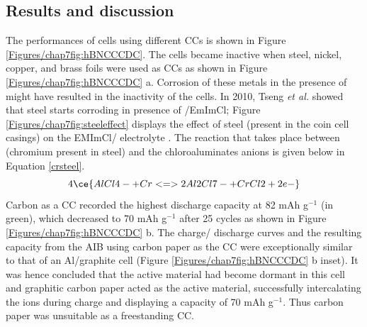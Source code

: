 \subsection{Results and discussion}
The performances of cells using different CCs is shown in Figure \ref{Figures/chap7fig:hBNCCCDC}. The cells became inactive when steel, nickel, copper, and brass foils were used as CCs as shown in Figure \ref{Figures/chap7fig:hBNCCCDC} a. Corrosion of these metals in the presence of  might have resulted in the inactivity of the cells. In 2010, Tseng \textit{et al.} showed that steel starts corroding in presence of /EmImCl; Figure \ref{Figures/chap7fig:steeleffect} displays the effect of steel (present in the coin cell casings) on the EMImCl/ electrolyte \cite{reed_roles_2013, tseng_corrosion_2010}. The reaction that takes place between (chromium present in steel) and the chloroaluminates anions is given below in Equation \ref{crsteel}.
\begin{equation} \label{crsteel}
4\ce{AlCl4- + Cr <=> 2Al2Cl7- + CrCl2 + 2e-} 
\end{equation}
Carbon as a CC recorded the highest discharge capacity at 82 mAh g$^{-1}$ (in green), which decreased to 70 mAh g$^{-1}$ after 25 cycles as shown in Figure \ref{Figures/chap7fig:hBNCCCDC} b. The charge/ discharge curves and the resulting capacity from the AIB using carbon paper as the CC were exceptionally similar to that of an Al/graphite cell (Figure \ref{Figures/chap7fig:hBNCCCDC} b inset). It was hence concluded that the active material had become dormant in this cell and graphitic carbon paper acted as the active material, successfully intercalating the  ions during charge and displaying a capacity of 70 mAh g$^{-1}$. Thus carbon paper was unsuitable as a freestanding CC. 
